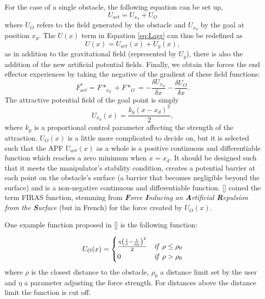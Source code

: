 For the case of a single obstacle, the following equation can be set up,
\begin{equation}
	U_{art} = U_{x_d} + U_O 
\end{equation}
where $U_{O}$ refers to the field generated by the obstacle and $U_{x_d}$ by the goal at position $x_d$.  The $U(x)$ term in Equation \ref{eq:Lagr} can thus be redefined as
\begin{equation}
	U(x) = U_{art}(x) + U_g(x),
\end{equation}
as in addition to the gravitational field (represented by $U_g$), there is also the addition of the new artificial potential fields. Finally, we obtain the forces the end effector experiences by taking the negative of the gradient of these field functions:
\begin{equation}
	F^*_{art} = F*_{x_d} + F*_O = -\frac{\delta U_{x_d}}{\delta x} -\frac{\delta U_O}{\delta x}.
\end{equation}
The attractive potential field of the goal point is simply
\begin{equation}
	U_{x_d}(x) = \frac{k_p(x - x_d)^2}{2},
\end{equation}
where $k_p$ is a proportional control parameter affecting the strength of the attraction. $U_{O}(x)$ is a little more complicated to decide on, but it is selected such that the \gls{APF} $U_{art}(x)$ as a whole is a positive continuous and differentiable function which reaches a zero minimum when $x = x_d$. It should be designed such that it meets the manipulator's stability condition, creates a potential barrier at each point on the obstacle's surface (a barrier that becomes negligible beyond the surface) and is a non-negative continuous and differentiable function. [\citeauthor{Khatib}] coined the term FIRAS function, stemming from \textit{\textbf{F}orce \textbf{I}nducing an \textbf{A}rtificial \textbf{R}epulsion from the \textbf{S}urface} (but in French) for the force created by $U_O(x)$.

One example function proposed in [\citeauthor{Khatib1980}] is the following function:

\begin{equation}
U_O(x) = \begin{cases} 
	\frac{\eta \left(\frac{1}{\rho} - \frac{1}{\rho_0}\right)^2}{2} & \text{\textit{if}  } \rho \leq \rho_0 \\
	0 & \text{\textit{if}  } \rho > \rho_0 
\end{cases}
\label{eq:discPotF}
\end{equation}
where $\rho$ is the closest distance to the obstacle, $\rho_0$ a distance limit set by the user and $\eta$ a parameter adjusting the force strength. For distances above the distance limit the function is cut off.

